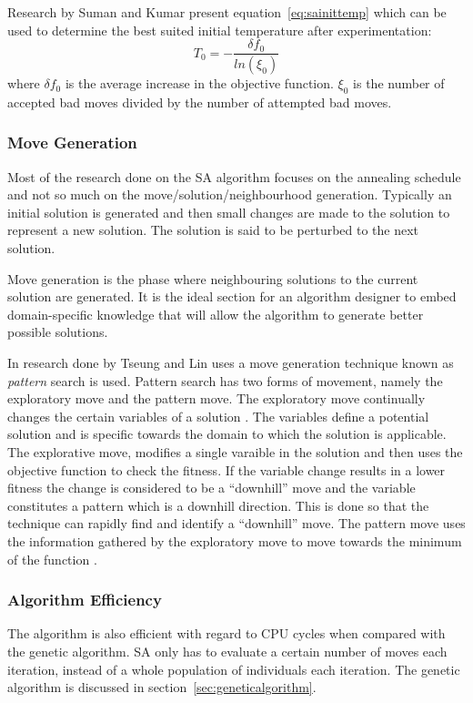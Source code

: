 Research by Suman and Kumar\cite{SASingleMultiObj} present equation~\ref{eq:sainittemp} which can be used to determine the best suited initial temperature after experimentation:
\begin{equation}
    \label{eq:sainittemp}
    T_0=-\frac{\delta f_0}{ln(\xi_0)}
\end{equation}
where $\delta f_0$ is the average increase in the objective function. $\xi_0$ is the number of accepted bad moves divided by the number of attempted bad moves\cite{SASingleMultiObj}.

\subsubsection{Move Generation}
Most of the research done on the \gls{SA} algorithm focuses on the annealing schedule and not so much on the move/solution/neighbourhood generation. Typically an initial solution is generated and then small changes are made to the solution to represent a new solution. The solution is said to be perturbed to the next solution.

Move generation is the phase where neighbouring solutions to the current solution are generated. It is the ideal section for an algorithm designer to embed domain-specific knowledge that will allow the algorithm to generate better possible solutions.

In research done by Tseung and Lin \cite{CurveFittingSA} uses a move generation technique known as \emph{pattern} search is used. Pattern search has two forms of movement, namely the exploratory move and the pattern move. The exploratory move continually changes the certain variables of a solution \cite{CurveFittingSA}. The variables define a potential solution and is specific towards the domain to which the solution is applicable. The explorative move, modifies a single varaible in the solution and then uses the objective function to check the fitness. If the variable change results in a lower fitness the change is considered to be a ``downhill'' move and the variable constitutes a pattern which is a downhill direction. This is done so that the technique can rapidly find and identify a ``downhill'' move. The pattern move uses the information gathered by the exploratory move to move towards the minimum of the function \cite{CurveFittingSA}.
\subsubsection{Algorithm Efficiency}
The algorithm is also efficient with regard to CPU cycles when compared with the genetic algorithm. \gls{SA} only has to evaluate a certain number of moves each iteration, instead of a whole population of individuals each iteration. The genetic algorithm is discussed in section~\ref{sec:geneticalgorithm}.

